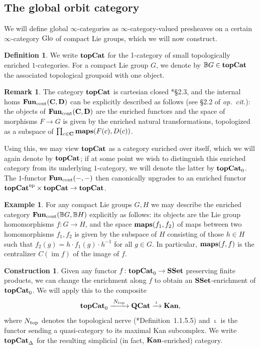 \documentclass[reqno]{memo-l}
\theoremstyle{mythm}
\theoremstyle{definition}
\newtheorem{rk}[thm]{Remark}
\newtheorem{constr}[thm]{Construction}
\newtheorem{ex}[thm]{Example}
\newtheorem{definition}[thm]{Definition}
\numberwithin{equation}{section}
\newcommand{\Ntop}{{N_\textup{top}}}
\newcommand{\cat}[1]{\textbf{\textup{#1}}}
\newcommand{\maps}{\cat{maps}}
\newcommand{\op}{{\textup{op}}}
\DeclareMathOperator{\core}{\iota}
\newcommand{\Glo}{\textup{Glo}}
\newcommand{\topCat}{\cat{topCat}}
\newcommand{\BGcat}[1]{\mathbb B{#1}}
\DeclareMathOperator{\im}{im}
\begin{document}
\subsection{The global orbit category} We will define global $\infty$-categories as $\infty$-category-valued presheaves on a certain $\infty$-category $\Glo$ of compact Lie groups, which we will now construct.

\begin{definition}
    We write $\topCat$ for the 1-category of small topologically enriched $1$-categories. For a compact Lie group $G$, we denote by $\BGcat{G}\in\topCat$ the associated topological groupoid with one object.  
\end{definition}

\begin{rk}
    The category $\topCat$ is cartesian closed \cite{kelly-enriched}*{§2.3}, and the internal homs $\cat{Fun}_\text{cont}(\cat{C},\cat{D})$ can be explicitly described as follows (see §2.2 of \emph{op.\ cit.}): the objects of $\cat{Fun}_\text{cont}(\cat{C},\cat{D})$ are the enriched functors and the space of morphisms $F\to G$ is given by the enriched natural transformations, topologized as a subspace of $\prod_{c\in\cat{C}}\maps(F(c),D(c))$. 

    Using this, we may view $\cat{topCat}$ as a category enriched over itself, which we will again denote by $\cat{topCat}$; if at some point we wish to distinguish this enriched category from its underlying $1$-category, we will denote the latter by $\cat{topCat}_0$. The $1$-functor $\cat{Fun}_\text{cont}(-,-)$ then canonically upgrades to an enriched functor $\topCat^\op\times\topCat\to\topCat$.
\end{rk}

\begin{ex}\label{ex:glo-mapping-space}
    For any compact Lie groups $G,H$ we may describe the enriched category $\cat{Fun}_\text{cont}(\BGcat{G},\BGcat{H})$ explicitly as follows: its objects are the Lie group homomorphisms $f\colon G\to H$, and the space $\maps(f_1,f_2)$ of maps between two homomorphisms $f_1,f_2$ is given by the subspace of $H$ consisting of those $h\in H$ such that $f_2(g)=h\cdot f_1(g)\cdot h^{-1}$ for all $g\in G$. In particular, $\maps(f,f)$ is the centralizer $C(\im f)$ of the image of $f$.
\end{ex}

\begin{constr}
    Given any functor $f\colon\cat{topCat}_0\to\cat{SSet}$ preserving finite products, we can change the enrichment along $f$ to obtain an $\cat{SSet}$-enrichment of $\cat{topCat}_0$. We will apply this to the composite
    \[
        \cat{topCat}_0\xrightarrow{\;\Ntop\;}\cat{QCat}\xrightarrow{\;\core\;}\cat{Kan},
    \]
    where $\Ntop$ denotes the topological nerve (\cite{HTT}*{Definition~1.1.5.5}) and $\core$ is the functor sending a quasi-category to its maximal Kan subcomplex. We write $\cat{topCat}_\Delta$ for the resulting simplicial (in fact, $\cat{Kan}$-enriched) category.
\end{constr}
\end{document}
